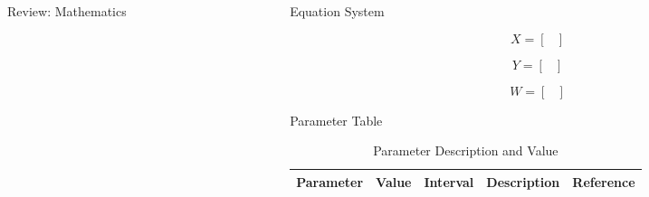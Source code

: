 \begin{frame}[t]
\begin{columns}[t]
\begin{column}{\onecolwid}
\begin{alertblock}{Review: Mathematics}
\end{alertblock}
\end{column}
\begin{column}{\onecolwid} %
\begin{alertblock}{Equation System}

\begin{equation}
X=
\begin{bmatrix}
\end{bmatrix}
\end{equation}  

\begin{equation}
Y=
\begin{bmatrix}
\end{bmatrix}
\end{equation}  

\begin{equation}
W=
\begin{bmatrix}
\end{bmatrix}
\end{equation}  

\end{alertblock}
\begin{alertblock}{Parameter Table}

\vspace{4pt}
\centering
\begin{table}[h]\footnotesize
	\caption{Parameter Description and Value}
	\begin{tabular}{rllp{2cm}l}
		\hline	
		Parameter & Value & Interval & Description & Reference \\
		\hline 
	\end{tabular}	
\end{table}


\end{alertblock}
\end{column}
\end{columns}
\end{frame}
